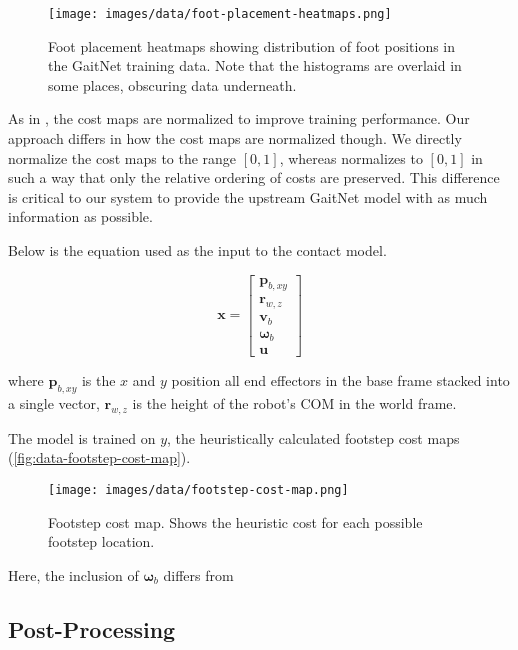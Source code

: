 \begin{figure}
  \centering
  \texttt{[image: images/data/foot-placement-heatmaps.png]}
  \caption{Foot placement heatmaps showing distribution of foot
    positions in the GaitNet training data. Note that the histograms
  are overlaid in some places, obscuring data underneath.}
  \label{fig:data-cn-training-process}
\end{figure}

As in \cite{bratta_contactnet_2024}, the cost maps are normalized to
improve training performance. Our approach differs in how the cost
maps are normalized though. We directly normalize the cost maps to
the range $[0, 1]$, whereas \cite{bratta_contactnet_2024} normalizes
to $[0,1]$ in such a way that only the relative ordering of costs are
preserved. This difference is critical to our system to provide the
upstream GaitNet model with as much information as possible.

Below is the equation used as the input to the contact model.

\[
  \mathbf{x} =
  \begin{bmatrix}
    \mathbf p_{b,xy} \\
    \mathbf r_{w,z} \\
    \mathbf v_b \\
    \mathbf \omega_b \\
    \mathbf u
  \end{bmatrix}
\]

where
$\mathbf p_{b,xy}$ is the $x$ and $y$ position all end effectors in
the base frame stacked into a single vector,
$\mathbf r_{w,z}$ is the height of the robot's COM in the world frame.

The model is trained on $y$, the heuristically calculated footstep
cost maps (\autoref{fig:data-footstep-cost-map}).

\begin{figure}
  \centering
  \texttt{[image: images/data/footstep-cost-map.png]}
  \caption{Footstep cost map. Shows the heuristic cost for each
  possible footstep location.}
  \label{fig:data-footstep-cost-map}
\end{figure}

Here, the inclusion of $\mathbf \omega_b$ differs from
\cite{bratta_contactnet_2024}

\subsection{Post-Processing}

